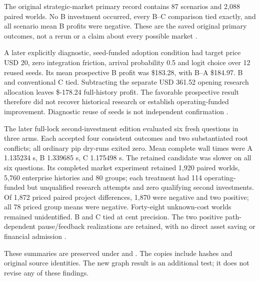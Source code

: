 
The original strategic-market primary record contains 87 scenarios and 2,088 paired worlds. No B investment occurred, every B--C comparison tied exactly, and all scenario mean B profits were negative. These are the saved original primary outcomes, not a rerun or a claim about every possible market \citep{priorstrategic}.

A later explicitly diagnostic, seed-funded adoption condition had target price USD 20, zero integration friction, arrival probability 0.5 and logit choice over 12 reused seeds. Its mean prospective B profit was \$183.28, with B--A \$184.97. B and conventional C tied. Subtracting the separate USD 361.52 opening research allocation leaves \$-178.24 full-history profit. The favorable prospective result therefore did not recover historical research or establish operating-funded improvement. Diagnostic reuse of seeds is not independent confirmation \citep{priorstrategic}.

The later full-lock second-investment edition evaluated six fresh questions in three arms. Each accepted four consistent outcomes and two substantiated root conflicts; all ordinary pip dry-runs exited zero. Mean complete wall times were A 1.135234 s, B 1.339685 s, C 1.175498 s. The retained candidate was slower on all six questions. Its completed market experiment retained 1,920 paired worlds, 5,760 enterprise histories and 80 groups; each treatment had 114 operating-funded but unqualified research attempts and zero qualifying second investments. Of 1,872 priced paired project differences, 1,870 were negative and two positive; all 78 priced group means were negative. Forty-eight unknown-cost worlds remained unidentified. B and C tied at cent precision. The two positive path-dependent pause/feedback realizations are retained, with no direct asset saving or financial admission \citep{priorsecond}.

These summaries are preserved under  and . The copies include hashes and original source identities. The new graph result is an additional test; it does not revise any of these findings.
